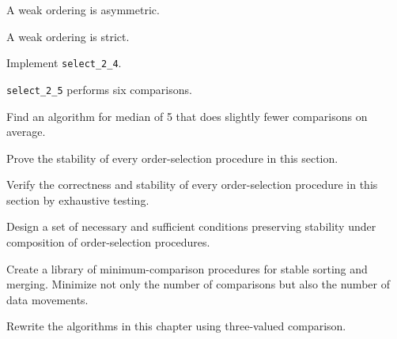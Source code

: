 \begin{lemma}
	A weak ordering is asymmetric.
\end{lemma}

\begin{lemma}
	A weak ordering is strict.
\end{lemma}

\begin{exercise}
	Implement \verb|select_2_4|.
\end{exercise}

\begin{lemma}
	\verb|select_2_5| performs six comparisons.
\end{lemma}

\begin{exercise}
	Find an algorithm for median of 5 that does slightly fewer comparisons
	on average.
\end{exercise}

\begin{exercise}
	Prove the stability of every order-selection procedure in this
	section.
\end{exercise}

\begin{exercise}
	Verify the correctness and stability of every order-selection
	procedure in this section by exhaustive testing.
\end{exercise}

\begin{project}
	Design a set of necessary and sufficient conditions preserving
	stability under composition of order-selection procedures.
\end{project}

\begin{project}
	Create a library of minimum-comparison procedures for stable
	sorting and merging. Minimize not only the number of comparisons
	but also the number of data movements.
\end{project}

\begin{exercise}
	Rewrite the algorithms in this chapter using three-valued
	comparison.
\end{exercise}
